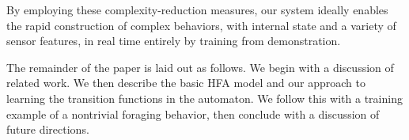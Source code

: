 \documentclass{aamas2010_cameraReady}
\begin{document}
By employing these complexity-reduction measures, our system ideally enables the rapid construction of complex behaviors, with internal state and a variety of sensor features, in real time entirely by training from demonstration.

The remainder of the paper is laid out as follows.  We begin with a discussion of related work.  We then describe the basic HFA model and our approach to learning the transition functions in the automaton.  We follow this with a training example of a nontrivial foraging behavior, then conclude with a discussion of future directions.









%


\end{document}
